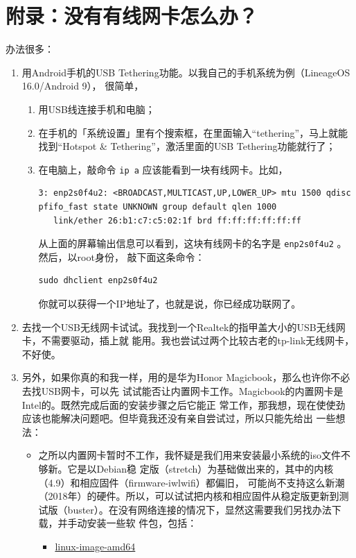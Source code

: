 \documentclass{wx672ctexart} \usepackage{hyperref}
\begin{document}
\section{附录：没有有线网卡怎么办？}
\label{sec:orgd858525}
办法很多：
\begin{enumerate}
\item 用Android手机的USB Tethering功能。以我自己的手机系统为例（LineageOS 16.0/Android 9），
很简单，
\begin{enumerate}
\item 用USB线连接手机和电脑；
\item 在手机的「系统设置」里有个搜索框，在里面输入“tethering”，马上就能找到“Hotspot \&
Tethering”，激活里面的USB Tethering功能就行了；
\item 在电脑上，敲命令 \texttt{ip a} 应该能看到一块有线网卡。比如，
\begin{verbatim}
3: enp2s0f4u2: <BROADCAST,MULTICAST,UP,LOWER_UP> mtu 1500 qdisc pfifo_fast state UNKNOWN group default qlen 1000
   link/ether 26:b1:c7:c5:02:1f brd ff:ff:ff:ff:ff:ff
\end{verbatim}
从上面的屏幕输出信息可以看到，这块有线网卡的名字是 \texttt{enp2s0f4u2} 。然后，以root身份，
敲下面这条命令：
\begin{verbatim}
sudo dhclient enp2s0f4u2
\end{verbatim}
你就可以获得一个IP地址了，也就是说，你已经成功联网了。
\end{enumerate}
\item 去找一个USB无线网卡试试。我找到一个Realtek的指甲盖大小的USB无线网卡，不需要驱动，插上就
能用。我也尝试过两个比较古老的tp-link无线网卡，不好使。
\item 另外，如果你真的和我一样，用的是华为Honor Magicbook，那么也许你不必去找USB网卡，可以先
试试能否让内置网卡工作。Magicbook的内置网卡是Intel的。既然完成后面的安装步骤之后它能正
常工作，那我想，现在使使劲应该也能解决问题吧。但毕竟我还没有亲自尝试过，所以只能先给出
一些想法：
\begin{itemize}
\item 之所以内置网卡暂时不工作，我怀疑是我们用来安装最小系统的iso文件不够新。它是以Debian稳
定版（stretch）为基础做出来的，其中的内核（4.9）和相应固件（firmware-iwlwifi）都偏旧，
可能尚不支持这么新潮（2018年）的硬件。所以，可以试试把内核和相应固件从稳定版更新到测
试版（buster）。在没有网络连接的情况下，显然这需要我们另找办法下载，并手动安装一些软
件包，包括：
\begin{itemize}
\item \href{https://packages.debian.org/buster/linux-image-amd64}{linux-image-amd64}

\end{itemize}
\end{itemize}
\end{enumerate}
\end{document}
